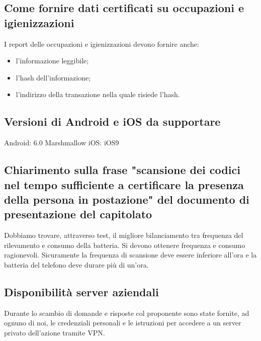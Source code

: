 \subsection*{Come fornire dati certificati su occupazioni e igienizzazioni}
I report delle occupazioni e igienizzazioni devono fornire anche:
\begin{itemize}
	\item l'informazione leggibile;
	\item l'hash dell'informazione;
	\item l'indirizzo della transazione nella quale risiede l'hash.
\end{itemize}

\subsection*{Versioni di Android e iOS da supportare}
Android: 6.0 Marshmallow \newline
iOS: iOS9


\subsection*{Chiarimento sulla frase "scansione dei codici nel tempo sufficiente a certificare la presenza della persona in postazione" del documento di presentazione del capitolato}
Dobbiamo trovare, attraverso test, il migliore bilanciamento tra frequenza del rilevamento e consumo della batteria. Si devono ottenere frequenza e consumo ragionevoli. Sicuramente la frequenza di scansione deve essere inferiore all'ora e la batteria del telefono deve durare più di un'ora.


\subsection*{Disponibilità server aziendali}
Durante lo scambio di domande e risposte col proponente sono state fornite, ad ognuno di noi, le credenziali personali e le istruzioni per accedere a un server privato dell'azione tramite VPN.




